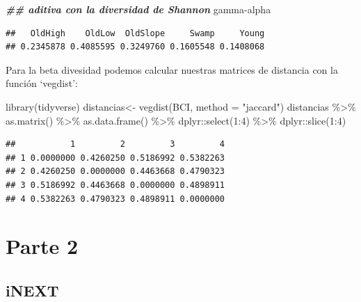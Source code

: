 \documentclass[
]{article}
\newenvironment{Shaded}{\begin{snugshade}}{\end{snugshade}}
\newcommand{\AttributeTok}[1]{\textcolor[rgb]{0.77,0.63,0.00}{#1}}
\newcommand{\DecValTok}[1]{\textcolor[rgb]{0.00,0.00,0.81}{#1}}
\newcommand{\DocumentationTok}[1]{\textcolor[rgb]{0.56,0.35,0.01}{\textbf{\textit{#1}}}}
\newcommand{\FunctionTok}[1]{\textcolor[rgb]{0.00,0.00,0.00}{#1}}
\newcommand{\NormalTok}[1]{#1}
\newcommand{\OtherTok}[1]{\textcolor[rgb]{0.56,0.35,0.01}{#1}}
\newcommand{\SpecialCharTok}[1]{\textcolor[rgb]{0.00,0.00,0.00}{#1}}
\newcommand{\StringTok}[1]{\textcolor[rgb]{0.31,0.60,0.02}{#1}}
\begin{document}
\begin{Shaded}
\begin{Highlighting}[]
\DocumentationTok{\#\# aditiva con la diversidad de Shannon}
\NormalTok{gamma}\SpecialCharTok{{-}}\NormalTok{alpha}
\end{Highlighting}
\end{Shaded}

\begin{verbatim}
##   OldHigh    OldLow  OldSlope     Swamp     Young 
## 0.2345878 0.4085595 0.3249760 0.1605548 0.1408068
\end{verbatim}

Para la beta divesidad podemos calcular nuestras matrices de distancia
con la función `vegdist':

\begin{Shaded}
\begin{Highlighting}[]
\FunctionTok{library}\NormalTok{(tidyverse)}
\NormalTok{distancias}\OtherTok{\textless{}{-}} \FunctionTok{vegdist}\NormalTok{(BCI, }\AttributeTok{method =} \StringTok{"jaccard"}\NormalTok{)}
\NormalTok{distancias }\SpecialCharTok{\%\textgreater{}\%} \FunctionTok{as.matrix}\NormalTok{() }\SpecialCharTok{\%\textgreater{}\%} \FunctionTok{as.data.frame}\NormalTok{() }\SpecialCharTok{\%\textgreater{}\%}\NormalTok{ dplyr}\SpecialCharTok{::}\FunctionTok{select}\NormalTok{(}\DecValTok{1}\SpecialCharTok{:}\DecValTok{4}\NormalTok{) }\SpecialCharTok{\%\textgreater{}\%}\NormalTok{ dplyr}\SpecialCharTok{::}\FunctionTok{slice}\NormalTok{(}\DecValTok{1}\SpecialCharTok{:}\DecValTok{4}\NormalTok{)}
\end{Highlighting}
\end{Shaded}

\begin{verbatim}
##           1         2         3         4
## 1 0.0000000 0.4260250 0.5186992 0.5382263
## 2 0.4260250 0.0000000 0.4463668 0.4790323
## 3 0.5186992 0.4463668 0.0000000 0.4898911
## 4 0.5382263 0.4790323 0.4898911 0.0000000
\end{verbatim}

\hypertarget{parte-2}{%
\section{Parte 2}\label{parte-2}}

\hypertarget{inext}{%
\subsection{iNEXT}\label{inext}}
\end{document}
